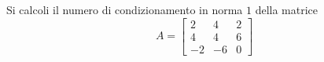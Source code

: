 Si calcoli il numero di condizionamento in norma $1$ della matrice
\bigskip
\[
A=\left[
\begin{array}{ccc}
2 & 4 & 2 \\
4 & 4 & 6\\
-2 & -6 & 0
\end{array}\right]
\]
